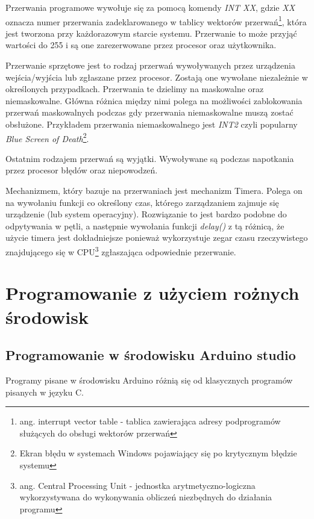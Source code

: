 \documentclass{xmgr}
\begin{document}
Przerwania programowe wywołuje się za pomocą komendy \emph{INT XX}, gdzie \emph{XX} oznacza numer przerwania zadeklarowanego w tablicy wektorów przerwań\footnote{ang. interrupt vector table - tablica zawierająca adresy podprogramów służących do obsługi wektorów przerwań}, która jest tworzona przy każdorazowym starcie systemu. Przerwanie to może przyjąć wartości do 255 i są one zarezerwowane przez procesor oraz użytkownika.

Przerwanie sprzętowe jest to rodzaj przerwań wywoływanych przez urządzenia wejścia/wyjścia lub zgłaszane przez procesor. Zostają one wywołane niezależnie w określonych przypadkach. Przerwania te dzielimy na maskowalne oraz niemaskowalne. Główna różnica między nimi polega na możliwości zablokowania przerwań maskowalnych podczas gdy przerwania niemaskowalne muszą zostać obsłużone. Przykładem przerwania niemaskowalnego jest \emph{INT2} czyli popularny \emph{Blue Screen of Death}\footnote{Ekran błędu w systemach Windows pojawiający się po krytycznym błędzie systemu}.

Ostatnim rodzajem przerwań są wyjątki. Wywoływane są podczas napotkania przez procesor błędów oraz niepowodzeń.

Mechanizmem, który bazuje na przerwaniach jest mechanizm Timera. Polega on na wywołaniu funkcji co określony czas, którego zarządzaniem zajmuje się urządzenie (lub system operacyjny). Rozwiązanie to jest bardzo podobne do odpytywania w pętli, a następnie wywołania funkcji \emph{delay()} z tą różnicą, że użycie timera jest dokładniejsze ponieważ wykorzystuje zegar czasu rzeczywistego znajdującego się w CPU\footnote{ang. Central Processing Unit - jednostka arytmetyczno-logiczna wykorzystywana do wykonywania obliczeń niezbędnych do działania programu} zgłaszająca odpowiednie przerwanie.


\chapter{Programowanie z użyciem rożnych środowisk}
\section{Programowanie w środowisku Arduino studio}
Programy pisane w środowisku Arduino różnią się od klasycznych programów pisanych w języku C. 
\end{document}
